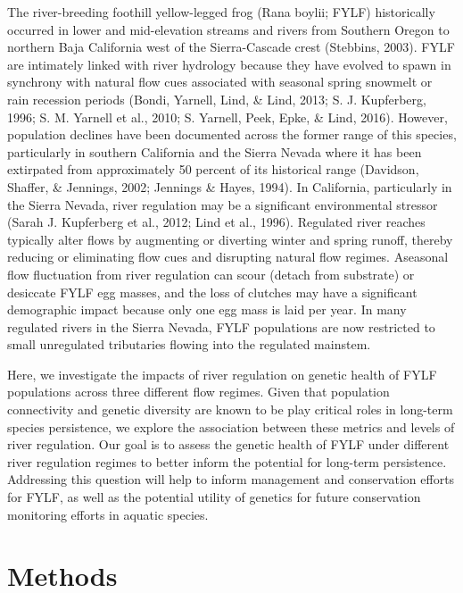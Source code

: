 \documentclass[twoside,12pt,final]{ucthesis-CA2012} %
\begin{document}
\begin{ucmainmatter}
The river-breeding foothill yellow-legged frog (Rana boylii; FYLF)
historically occurred in lower and mid-elevation streams and rivers from
Southern Oregon to northern Baja California west of the Sierra-Cascade
crest (Stebbins, 2003). FYLF are intimately linked with river hydrology
because they have evolved to spawn in synchrony with natural flow cues
associated with seasonal spring snowmelt or rain recession periods
(Bondi, Yarnell, Lind, \& Lind, 2013; S. J. Kupferberg, 1996; S. M.
Yarnell et al., 2010; S. Yarnell, Peek, Epke, \& Lind, 2016). However,
population declines have been documented across the former range of this
species, particularly in southern California and the Sierra Nevada where
it has been extirpated from approximately 50 percent of its historical
range (Davidson, Shaffer, \& Jennings, 2002; Jennings \& Hayes, 1994).
In California, particularly in the Sierra Nevada, river regulation may
be a significant environmental stressor (Sarah J. Kupferberg et al.,
2012; Lind et al., 1996). Regulated river reaches typically alter flows
by augmenting or diverting winter and spring runoff, thereby reducing or
eliminating flow cues and disrupting natural flow regimes. Aseasonal
flow fluctuation from river regulation can scour (detach from substrate)
or desiccate FYLF egg masses, and the loss of clutches may have a
significant demographic impact because only one egg mass is laid per
year. In many regulated rivers in the Sierra Nevada, FYLF populations
are now restricted to small unregulated tributaries flowing into the
regulated mainstem.

Here, we investigate the impacts of river regulation on genetic health
of FYLF populations across three different flow regimes. Given that
population connectivity and genetic diversity are known to be play
critical roles in long-term species persistence, we explore the
association between these metrics and levels of river regulation. Our
goal is to assess the genetic health of FYLF under different river
regulation regimes to better inform the potential for long-term
persistence. Addressing this question will help to inform management and
conservation efforts for FYLF, as well as the potential utility of
genetics for future conservation monitoring efforts in aquatic species.

\hypertarget{methods}{%
\section{Methods}\label{methods}}

\hypertarget{sample-collection}{%
}
\end{ucmainmatter}
\end{document}
